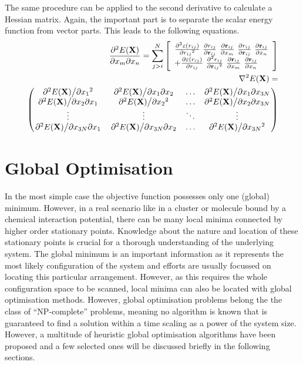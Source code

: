 The same procedure can be applied to the second derivative to calculate a
Hessian matrix. Again, the important part is to separate the scalar energy
function from vector parts. This leads to the following equations.
%
\begin{align}
    \pdv{E(\mathbf{X})}{x_m}{x_n}=\sum_{j>i}^N\left[  
    \begin{array}{ll}
    \pdv[2]{\varepsilon(r_{ij})}{{r_{ij}}}\  
    \pdv{r_{ij}}{\mathbf{r}_{ij}}\ 
    \pdv{\mathbf{r}_{ij}}{x_m}\ 
    \pdv{r_{ij}}{\mathbf{r}_{ij}}\ 
    \pdv{\mathbf{r}_{ij}}{x_n} \\ 
    +
    \pdv{\varepsilon(r_{ij})}{r_{ij}}\
        \pdv[2]{r_{ij}}{{\mathbf{r}_{ij}}}\ 
    \pdv{\mathbf{r}_{ij}}{x_m}\ 
    \pdv{\mathbf{r}_{ij}}{x_n} 
    \end{array}
    \right]\\
    \begin{aligned}
    \nabla^2 E(\mathbf{X})=\\
    \begin{pmatrix}
        \pdv*[2]{E(\mathbf{X})}{{x_1}} & \pdv*{E(\mathbf{X})}{x_1}{x_2} & \ldots & \pdv*{E(\mathbf{X})}{x_1}{x_{3N}}\\
        \pdv*{E(\mathbf{X})}{x_2}{x_1} & \pdv*[2]{E(\mathbf{X})}{{x_2}} & \ldots & \pdv*{E(\mathbf{X})}{x_2}{x_{3N}}\\
        \vdots & \vdots & \ddots & \vdots\\
        \pdv*{E(\mathbf{X})}{x_{3N}}{x_1} & \pdv*{E(\mathbf{X})}{x_{3N}}{x_2} & \ldots & \pdv*[2]{E(\mathbf{X})}{{x_{3N}}}
    \end{pmatrix}
    \end{aligned}
\end{align}

\section{Global Optimisation}
\label{sec:GlobalOptimisation}

In the most simple case the objective function possesses only one (global)
minimum. However, in a real scenario like in a cluster or molecule bound by a
chemical interaction potential, there can be many local minima connected by
higher order stationary points. Knowledge about the nature and location of these
stationary points is crucial for a thorough understanding of the underlying
system. The global minimum is an important information as it represents the most
likely configuration of the system and efforts are usually focussed on locating
this particular arrangement. However, as this requires the whole configuration
space to be scanned, local minima can also be located with global optimisation
methods.  However, global optimisation problems belong the the class of
``NP-complete'' problems, meaning no algorithm is known that is guaranteed to
find a solution within a time scaling as a power of the system size. However, a
multitude of heuristic global optimisation algorithms have been proposed and a
few selected ones will be discussed briefly in the following sections.

